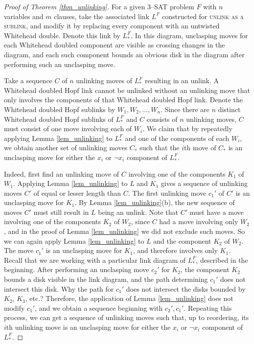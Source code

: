 \documentclass[12pt]{amsart}
\theoremstyle{definition}
\theoremstyle{remark}
\begin{document}
\begin{proof}[Proof of Theorem \ref{thm_unlinking}]
For a given 3--\textsc{SAT} problem $F$ with $n$ variables and $m$ clauses, take the associated link $L^F$ constructed for \textsc{unlink as a sublink}, and modify it by replacing every component with an untwisted Whitehead double.
Denote this link by $L_{*}^F$.
In this diagram, unclasping moves for each Whitehead doubled component are visible as crossing changes in the diagram, and each such component bounds an obvious disk in the diagram after performing such an unclasping move.

Take a sequence $C$ of $n$ unlinking moves of $L_{*}^F$ resulting in an unlink.
A Whitehead doubled Hopf link cannot be unlinked without an unlinking move that only involves the components of that Whitehead doubled Hopf link.
Denote the Whitehead doubled Hopf sublinks by $W_1, W_2, ..., W_n$.
Since there are $n$ distinct Whitehead doubled Hopf sublinks of $L_{*}^F$ and $C$ consists of $n$ unlinking moves, $C$ must consist of one move involving each of $W_i$.
We claim that by repeatedly applying Lemma \ref{lem_unlinking} to $L_{*}^F$ and one of the components of each $W_i$, we obtain another set of unlinking moves $C_*$ such that the $i$th move of $C_*$ is an unclasping move for either the $x_i$ or $\neg x_i$ component of $L_*^F$.

Indeed, first find an unlinking move of $C$ involving one of the components $K_1$ of $W_1$.
Applying Lemma \ref{lem_unlinking} to $L$ and $K_1$ gives a sequence of unlinking moves $C'$ of equal or lesser length than $C$.
The first unlinking move $c_1'$ of $C'$ is an unclasping move for $K_1$.
By Lemma \ref{lem_unlinking}(b), the new sequence of moves $C'$ must still result in $L$ being an unlink.
Note that $C'$ must have a move involving one of the components $K_2$ of $W_2$, since $C$ had a move involving only $W_2$, and in the proof of Lemma \ref{lem_unlinking} we did not exclude such moves.
So we can again apply Lemma \ref{lem_unlinking} to $L$ and the component $K_2$ of $W_2$.
The move $c_1'$ is an unclasping move for $K_1$, and therefore involves only $K_1$.
Recall that we are working with a particular link diagram of $L_*^F$, described in the beginning.
After performing an unclasping move $c_2'$ for $K_2$, the component $K_2$ bounds a disk visible in the link diagram, and the path determining $c_1'$ does not intersect this disk.
Why the path for $c_1'$ does not intersect the disks bounded by $K_2$, $K_3$, etc.?
Therefore, the application of Lemma \ref{lem_unlinking} does not modify $c_1'$, and we obtain a sequence beginning with $c_2', c_1'$.
Repeating this process, we can get a sequence of unlinking moves such that, up to reordering, its $i$th unlinking move is an unclasping move for either the $x_i$ or $\neg x_i$ component of $L_*^F$.


\end{proof}
\end{document}

